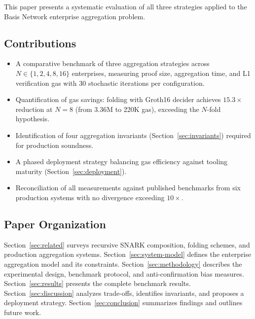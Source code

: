 This paper presents a systematic evaluation of all three strategies
applied to the Basis Network enterprise aggregation problem.

\subsection{Contributions}

\begin{itemize}
  \item A comparative benchmark of three aggregation strategies across
    $N \in \{1, 2, 4, 8, 16\}$ enterprises, measuring proof size,
    aggregation time, and L1 verification gas with 30 stochastic
    iterations per configuration.
  \item Quantification of gas savings: folding with Groth16 decider
    achieves $15.3\times$ reduction at $N{=}8$ (from 3.36M to 220K
    gas), exceeding the $N$-fold hypothesis.
  \item Identification of four aggregation invariants
    (Section~\ref{sec:invariants}) required for production soundness.
  \item A phased deployment strategy balancing gas efficiency against
    tooling maturity (Section~\ref{sec:deployment}).
  \item Reconciliation of all measurements against published benchmarks
    from six production systems with no divergence exceeding $10\times$.
\end{itemize}

\subsection{Paper Organization}

Section~\ref{sec:related} surveys recursive SNARK composition, folding
schemes, and production aggregation systems.
Section~\ref{sec:system-model} defines the enterprise aggregation model
and its constraints. Section~\ref{sec:methodology} describes the
experimental design, benchmark protocol, and anti-confirmation bias
measures. Section~\ref{sec:results} presents the complete benchmark
results. Section~\ref{sec:discussion} analyzes trade-offs, identifies
invariants, and proposes a deployment strategy.
Section~\ref{sec:conclusion} summarizes findings and outlines future
work.
